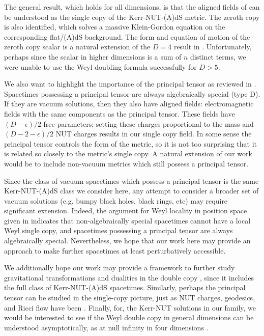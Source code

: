 The general result, which holds for all dimensions, is that the aligned fields of \cite{Krtous:2007xg} can be
understood as the single copy of the Kerr-NUT-(A)dS metric. The zeroth copy is also identified, which solves a
massive Klein-Gordon equation on the corresponding flat/(A)dS background. The form and equation of motion of the
zeroth copy scalar is a natural extension of the $D = 4$ result in \cite{Luna:2015paa}. Unfortunately,
perhaps since the scalar in higher dimensions is a sum of $n$ distinct terms, we were unable to use the Weyl
doubling formula successfully for $D > 5$.

We also want to highlight the importance of the principal tensor as reviewed in \cite{Frolov:2017kze}.  Spacetimes
possessing a principal tensor are always algebraically special (type D).  If they are vacuum solutions, then they
also have aligned fields: electromagnetic fields with the same components as the principal tensor. These fields have $(D-\epsilon)/2$ free parameters; setting these charges proportional to the mass and $(D-2-\epsilon)/2$ NUT charges results in our single copy field. In some sense the principal tensor controls the form of the metric, so it is not too surprising that it is related so closely to the metric's single copy.  A natural extension of our work would be to include non-vacuum metrics which still possess a principal tensor.


Since the class of vacuum spacetimes which possess a principal tensor is the same Kerr-NUT-(A)dS class we consider here, any attempt to consider a broader set of vacuum solutions (e.g. bumpy black holes, black rings, etc) may require significant extension. 
Indeed, the argument for Weyl locality in position space given in \cite{Luna:2022dxo} indicates that
non-algebraically special spacetimes cannot have a local Weyl single copy, and spacetimes possessing a principal
tensor are always algebraically special.  Nevertheless, we hope that our work here may provide an approach to make further spacetimes at least perturbatively accessible.

We additionally hope our work may provide a framework to further study gravitational transformations and dualities in the double copy \cite{Bahjat-Abbas:2020cyb,Arkani-Hamed:2019ymq,Alawadhi:2019urr,Banerjee:2019saj,Huang:2019cja,Emond:2020lwi}, since it includes the full class of Kerr-NUT-(A)dS spacetimes.  Similarly, perhaps the principal tensor can be studied in the single-copy picture, just as NUT charges, geodesics, and Ricci flow have been \cite{Alfonsi:2020lub,Alawadhi:2022gwy,Gonzo:2021drq,Alawadhi:2021uie}.  Finally, for, the Kerr-NUT solutions in our family, we would be interested to see if the Weyl double copy in general dimensions can be understood asymptotically, as at null infinity in four dimensions \cite{Godazgar:2021iae,Luna:2016due,Gonzo:2022tjm,Chacon:2021hfe,Adamo:2021dfg,Campiglia:2021srh}.


